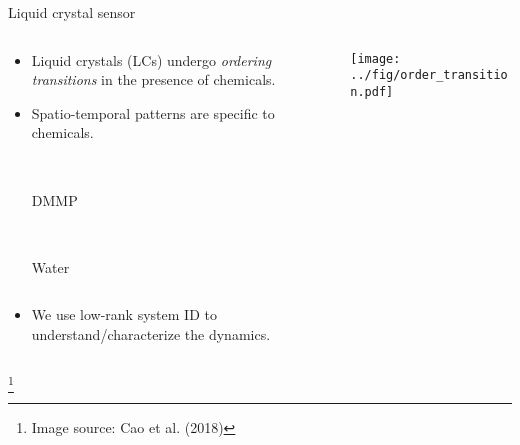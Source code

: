 \documentclass[10pt]{beamer}
\newcommand\blfootnote[1]{%
  \begingroup
  \renewcommand\thefootnote{}\footnote{#1}%
  \addtocounter{footnote}{-1}%
  \endgroup
}
\newcommand{\blue}{\color{blue}}
\begin{document}
\begin{frame}{Liquid crystal sensor}
    \begin{columns}
    \begin{column}{0.6\textwidth}
      \begin{itemize}
      \item Liquid crystals (LCs) undergo {\blue\em ordering transitions} in the presence of chemicals.
        \vspace{0.2in}
      \item Spatio-temporal patterns are specific to chemicals.
        
        \vspace{0.1in}
        \begin{column}{0.25\textwidth}
          \centering
          \\
          DMMP
        \end{column}
        \begin{column}{0.25\textwidth}
          \centering
          \\
          Water
        \end{column}
        \vspace{0.2in}
      \item We use low-rank system ID to {\blue understand/characterize the dynamics}.
      \end{itemize}
    \end{column}
    \begin{column}{0.4\textwidth}
      \texttt{[image: ../fig/order\_transition.pdf]}
    \end{column}
  \end{columns}
  \blfootnote{Image source: Cao et al. (2018)}
\end{frame}
\end{document}
